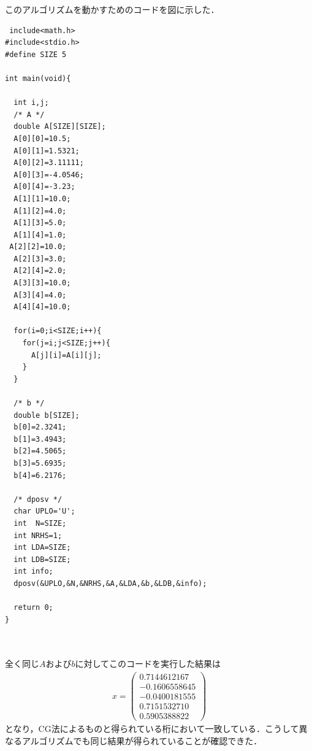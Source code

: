 \documentclass[a4j]{jarticle}
\begin{document}
このアルゴリズムを動かすためのコードを図に示した．
\begin{lstlisting}
 include<math.h>
#include<stdio.h>
#define SIZE 5 

int main(void){

  int i,j;
  /* A */
  double A[SIZE][SIZE];
  A[0][0]=10.5;
  A[0][1]=1.5321;
  A[0][2]=3.11111;
  A[0][3]=-4.0546;
  A[0][4]=-3.23;
  A[1][1]=10.0;
  A[1][2]=4.0;
  A[1][3]=5.0;
  A[1][4]=1.0;
 A[2][2]=10.0;
  A[2][3]=3.0;
  A[2][4]=2.0;
  A[3][3]=10.0;
  A[3][4]=4.0;
  A[4][4]=10.0;

  for(i=0;i<SIZE;i++){
    for(j=i;j<SIZE;j++){
      A[j][i]=A[i][j];
    }
  }

  /* b */
  double b[SIZE];
  b[0]=2.3241;
  b[1]=3.4943;
  b[2]=4.5065;
  b[3]=5.6935;
  b[4]=6.2176;

  /* dposv */
  char UPLO='U';
  int  N=SIZE; 
  int NRHS=1; 
  int LDA=SIZE; 
  int LDB=SIZE; 
  int info;
  dposv(&UPLO,&N,&NRHS,&A,&LDA,&b,&LDB,&info);

  return 0;
}



\end{lstlisting}



全く同じ$A$および$b$に対してこのコードを実行した結果は
\begin{align*}
 x=
\begin{pmatrix}
    0.7144612167 \\
    -0.1606558645\\
    -0.0400181555\\
     0.7151532710\\
     0.5905388822
\end{pmatrix}
\end{align*}
となり，CG法によるものと得られている桁において一致している．こうして異なるアルゴリズムでも同じ結果が得られていることが確認できた．
\end{document}
